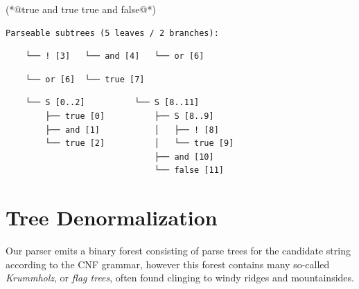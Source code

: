 \documentclass[sigplan,nonacm]{acmart}\settopmatter{printfolios=false,printccs=false,printacmref=false}
\begin{document}
\begin{tidyinput}
(*@true and true  true and false\caret{ }@*)
\end{tidyinput}

\begin{verbatim}
Parseable subtrees (5 leaves / 2 branches):
\end{verbatim}
\noindent\hspace{0.64cm}\hspace{1.70cm}\hspace{1.98cm}\vspace{-5pt}
\begin{verbatim}
    └── ! [3]   └── and [4]   └── or [6]
\end{verbatim}
\noindent\hspace{0.64cm}\hspace{1.70cm}\vspace{-5pt}
\begin{verbatim}
    └── or [6]  └── true [7]
\end{verbatim}
\hspace{0.63cm}\hspace{3.4cm}\vspace{-5pt}
\begin{verbatim}
    └── S [0..2]          └── S [8..11]
        ├── true [0]          ├── S [8..9]
        ├── and [1]           │   ├── ! [8]
        └── true [2]          │   └── true [9]
                              ├── and [10]
                              └── false [11]
\end{verbatim}

\pagebreak
\section{Tree Denormalization}


Our parser emits a binary forest consisting of parse trees for the candidate string according to the CNF grammar, however this forest contains many so-called \textit{Krummholz}, or \textit{flag trees}, often found clinging to windy ridges and mountainsides.
\end{document}
